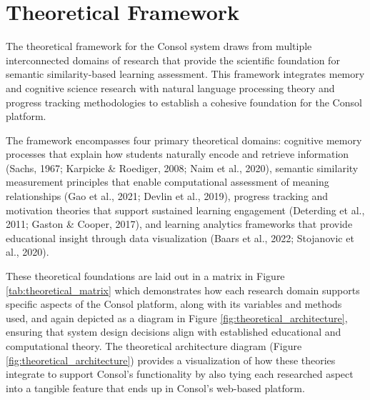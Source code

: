 
\chapter{Theoretical Framework}
\label{chap:theoretical_framework}



{\color{maroon}
The theoretical framework for the Consol system draws from multiple interconnected domains of research that provide the scientific foundation for semantic similarity-based learning assessment. This framework integrates memory and cognitive science research with natural language processing theory and progress tracking methodologies to establish a cohesive foundation for the Consol platform.

The framework encompasses four primary theoretical domains: cognitive memory processes that explain how students naturally encode and retrieve information (Sachs, 1967; Karpicke \& Roediger, 2008; Naim et al., 2020), semantic similarity measurement principles that enable computational assessment of meaning relationships (Gao et al., 2021; Devlin et al., 2019), progress tracking and motivation theories that support sustained learning engagement (Deterding et al., 2011; Gaston \& Cooper, 2017), and learning analytics frameworks that provide educational insight through data visualization (Baars et al., 2022; Stojanovic et al., 2020).

These theoretical foundations are laid out in a matrix in Figure \ref{tab:theoretical_matrix} which demonstrates how each research domain supports specific aspects of the Consol platform, along with its variables and methods used, and again depicted as a diagram in Figure \ref{fig:theoretical_architecture}, ensuring that system design decisions align with established educational and computational theory. The theoretical architecture diagram (Figure \ref{fig:theoretical_architecture}) provides a visualization of how these theories integrate to support Consol's functionality by also tying each researched aspect into a tangible feature that ends up in Consol's web-based platform.
}


